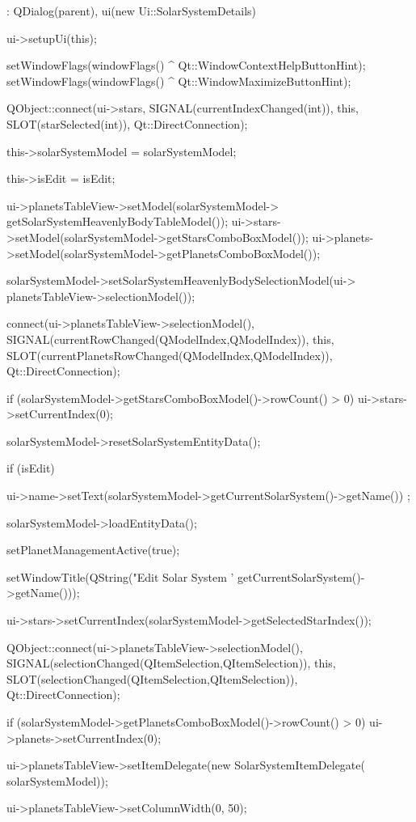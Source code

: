 \begin{DoxyCode}
                                                                               
                              :
    QDialog(parent),
    ui(new Ui::SolarSystemDetails)
{
    ui->setupUi(this);

    setWindowFlags(windowFlags() ^ Qt::WindowContextHelpButtonHint);
    setWindowFlags(windowFlags() ^ Qt::WindowMaximizeButtonHint);

    QObject::connect(ui->stars,
                     SIGNAL(currentIndexChanged(int)),
                     this,
                     SLOT(starSelected(int)),
                     Qt::DirectConnection);

    this->solarSystemModel = solarSystemModel;

    this->isEdit = isEdit;

    ui->planetsTableView->setModel(solarSystemModel->
      getSolarSystemHeavenlyBodyTableModel());
    ui->stars->setModel(solarSystemModel->getStarsComboBoxModel());
    ui->planets->setModel(solarSystemModel->getPlanetsComboBoxModel());

    solarSystemModel->setSolarSystemHeavenlyBodySelectionModel(ui->
      planetsTableView->selectionModel());

    connect(ui->planetsTableView->selectionModel(),
            SIGNAL(currentRowChanged(QModelIndex,QModelIndex)),
            this,
            SLOT(currentPlanetsRowChanged(QModelIndex,QModelIndex)),
            Qt::DirectConnection);

    if (solarSystemModel->getStarsComboBoxModel()->rowCount() > 0)
    {
        ui->stars->setCurrentIndex(0);
    }

    solarSystemModel->resetSolarSystemEntityData();

    if (isEdit)
    {
        ui->name->setText(solarSystemModel->getCurrentSolarSystem()->getName())
      ;

        solarSystemModel->loadEntityData();

        setPlanetManagementActive(true);

        setWindowTitle(QString("Edit Solar System '%
      getCurrentSolarSystem()->getName()));

        ui->stars->setCurrentIndex(solarSystemModel->getSelectedStarIndex());
    }

    QObject::connect(ui->planetsTableView->selectionModel(),
                     SIGNAL(selectionChanged(QItemSelection,QItemSelection)),
                     this,
                     SLOT(selectionChanged(QItemSelection,QItemSelection)),
                     Qt::DirectConnection);

    if (solarSystemModel->getPlanetsComboBoxModel()->rowCount() > 0)
    {
        ui->planets->setCurrentIndex(0);
    }

    ui->planetsTableView->setItemDelegate(new SolarSystemItemDelegate(
      solarSystemModel));

    ui->planetsTableView->setColumnWidth(0, 50);
}
\end{DoxyCode}
